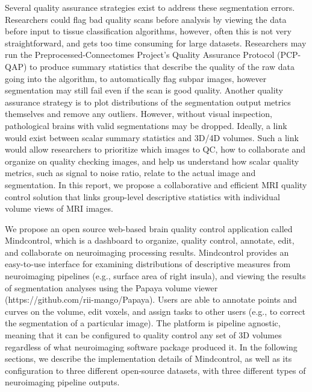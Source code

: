 Several quality assurance strategies exist to address these segmentation errors. Researchers could flag bad quality scans before analysis by viewing the data before input to tissue classification algorithms, however, often this is not very straightforward, and gets too time consuming for large datasets. Researchers may run the Preprocessed-Connectomes Project’s Quality Assurance Protocol (PCP-QAP)\cite{shehzadpreprocessed} to produce summary statistics that describe the quality of the raw data going into the algorithm, to automatically flag subpar images, however segmentation may still fail even if the scan is good quality. Another quality assurance strategy is to plot distributions of the segmentation output metrics themselves and remove any outliers. However, without visual inspection, pathological brains with valid segmentations may be dropped. Ideally, a link would exist between scalar summary statistics and 3D/4D volumes. Such a link would allow researchers to prioritize which images to QC, how to collaborate and organize on quality checking images, and help us understand how scalar quality metrics, such as signal to noise ratio, relate to the actual image and segmentation. In this report, we propose a collaborative and efficient MRI quality control solution that links group-level descriptive statistics with individual volume views of MRI images.  

We propose an open source web-based brain quality control application called Mindcontrol, which is a dashboard to organize, quality control, annotate, edit, and collaborate on neuroimaging processing results. Mindcontrol provides an easy-to-use interface for examining distributions of descriptive measures from neuroimaging pipelines (e.g., surface area of right insula), and viewing the results of segmentation analyses using the Papaya volume viewer (https://github.com/rii-mango/Papaya). Users are able to annotate points and curves on the volume, edit voxels, and assign tasks to other users (e.g., to correct the segmentation of a particular image). The platform is pipeline agnostic, meaning that it can be configured to quality control any set of 3D volumes regardless of what neuroimaging software package produced it. In the following sections, we describe the implementation details of Mindcontrol, as well as its configuration to three different open-source datasets, with three different types of neuroimaging pipeline outputs. 

